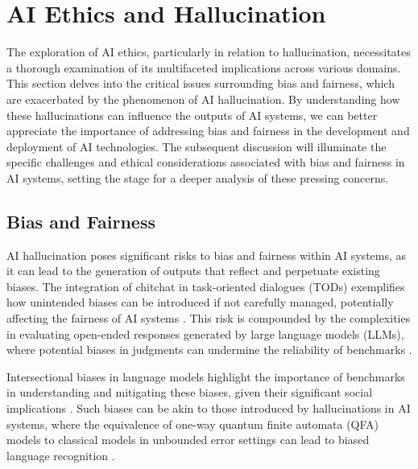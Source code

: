 \section{AI Ethics and Hallucination} \label{sec:AI Ethics and Hallucination}

 

The exploration of AI ethics, particularly in relation to hallucination, necessitates a thorough examination of its multifaceted implications across various domains. This section delves into the critical issues surrounding bias and fairness, which are exacerbated by the phenomenon of AI hallucination. By understanding how these hallucinations can influence the outputs of AI systems, we can better appreciate the importance of addressing bias and fairness in the development and deployment of AI technologies. The subsequent discussion will illuminate the specific challenges and ethical considerations associated with bias and fairness in AI systems, setting the stage for a deeper analysis of these pressing concerns.







\subsection{Bias and Fairness} \label{subsec:Bias and Fairness}

AI hallucination poses significant risks to bias and fairness within AI systems, as it can lead to the generation of outputs that reflect and perpetuate existing biases. The integration of chitchat in task-oriented dialogues (TODs) exemplifies how unintended biases can be introduced if not carefully managed, potentially affecting the fairness of AI systems \cite{tao2024rolecraftglmadvancingpersonalizedroleplaying}. This risk is compounded by the complexities in evaluating open-ended responses generated by large language models (LLMs), where potential biases in judgments can undermine the reliability of benchmarks \cite{alayrac2022flamingo}. 



Intersectional biases in language models highlight the importance of benchmarks in understanding and mitigating these biases, given their significant social implications \cite{wang2024espewrobustcopyrightprotection}. Such biases can be akin to those introduced by hallucinations in AI systems, where the equivalence of one-way quantum finite automata (QFA) models to classical models in unbounded error settings can lead to biased language recognition \cite{bogoychev2020domaintranslationesenoisesynthetic}. 



